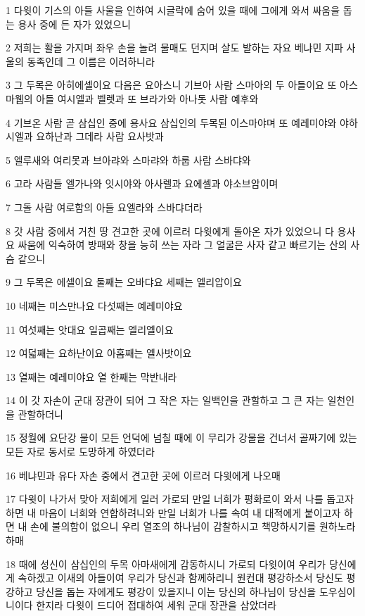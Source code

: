 \par 1 다윗이 기스의 아들 사울을 인하여 시글락에 숨어 있을 때에 그에게 와서 싸움을 돕는 용사 중에 든 자가 있었으니
\par 2 저희는 활을 가지며 좌우 손을 놀려 물매도 던지며 살도 발하는 자요 베냐민 지파 사울의 동족인데 그 이름은 이러하니라
\par 3 그 두목은 아히에셀이요 다음은 요아스니 기브아 사람 스마아의 두 아들이요 또 아스마웹의 아들 여시엘과 벨렛과 또 브라가와 아나돗 사람 예후와
\par 4 기브온 사람 곧 삼십인 중에 용사요 삼십인의 두목된 이스마야며 또 예레미야와 야하시엘과 요하난과 그데라 사람 요사밧과
\par 5 엘루새와 여리못과 브아랴와 스마랴와 하룹 사람 스바댜와
\par 6 고라 사람들 엘가나와 잇시야와 아사렐과 요에셀과 야소브암이며
\par 7 그돌 사람 여로함의 아들 요엘라와 스바댜더라
\par 8 갓 사람 중에서 거친 땅 견고한 곳에 이르러 다윗에게 돌아온 자가 있었으니 다 용사요 싸움에 익숙하여 방패와 창을 능히 쓰는 자라 그 얼굴은 사자 같고 빠르기는 산의 사슴 같으니
\par 9 그 두목은 에셀이요 둘째는 오바댜요 세째는 엘리압이요
\par 10 네째는 미스만나요 다섯째는 예레미야요
\par 11 여섯째는 앗대요 일곱째는 엘리엘이요
\par 12 여덟째는 요하난이요 아홉째는 엘사밧이요
\par 13 열째는 예레미야요 열 한째는 막반내라
\par 14 이 갓 자손이 군대 장관이 되어 그 작은 자는 일백인을 관할하고 그 큰 자는 일천인을 관할하더니
\par 15 정월에 요단강 물이 모든 언덕에 넘칠 때에 이 무리가 강물을 건너서 골짜기에 있는 모든 자로 동서로 도망하게 하였더라
\par 16 베냐민과 유다 자손 중에서 견고한 곳에 이르러 다윗에게 나오매
\par 17 다윗이 나가서 맞아 저희에게 일러 가로되 만일 너희가 평화로이 와서 나를 돕고자 하면 내 마음이 너희와 연합하려니와 만일 너희가 나를 속여 내 대적에게 붙이고자 하면 내 손에 불의함이 없으니 우리 열조의 하나님이 감찰하시고 책망하시기를 원하노라 하매
\par 18 때에 성신이 삼십인의 두목 아마새에게 감동하시니 가로되 다윗이여 우리가 당신에게 속하겠고 이새의 아들이여 우리가 당신과 함께하리니 원컨대 평강하소서 당신도 평강하고 당신을 돕는 자에게도 평강이 있을지니 이는 당신의 하나님이 당신을 도우심이니이다 한지라 다윗이 드디어 접대하여 세워 군대 장관을 삼았더라
